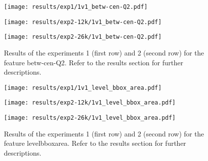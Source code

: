 \begin{figure}[h!]
    \centering
	\begin{minipage}{0.3\linewidth}
		\texttt{[image: results/exp1/1v1\_betw-cen-Q2.pdf]}
	\end{minipage}

	\begin{minipage}{0.3\linewidth}
		\texttt{[image: results/exp2-12k/1v1\_betw-cen-Q2.pdf]}
	\end{minipage}
	\begin{minipage}{0.3\linewidth}
		\texttt{[image: results/exp2-26k/1v1\_betw-cen-Q2.pdf]}
	\end{minipage}

	\caption[ Results: Feature betw-cen-Q2]{ Results of the experiments 1 (first row) and 2 (second row) for the feature betw-cen-Q2. Refer to the results section for further descriptions. }
	\label{fig:appendix_betw-cen-Q2}
\end{figure}
 \newpage 

 
\begin{figure}[h!]
    \centering
	\begin{minipage}{0.3\linewidth}
		\texttt{[image: results/exp1/1v1\_level\_bbox\_area.pdf]}
	\end{minipage}

	\begin{minipage}{0.3\linewidth}
		\texttt{[image: results/exp2-12k/1v1\_level\_bbox\_area.pdf]}
	\end{minipage}
	\begin{minipage}{0.3\linewidth}
		\texttt{[image: results/exp2-26k/1v1\_level\_bbox\_area.pdf]}
	\end{minipage}

	\caption[ Results: Feature level\textunderscore bbox\textunderscore area]{ Results of the experiments 1 (first row) and 2 (second row) for the feature level\textunderscore bbox\textunderscore area. Refer to the results section for further descriptions. }
	\label{fig:appendix_level_bbox_area}
\end{figure}
 
